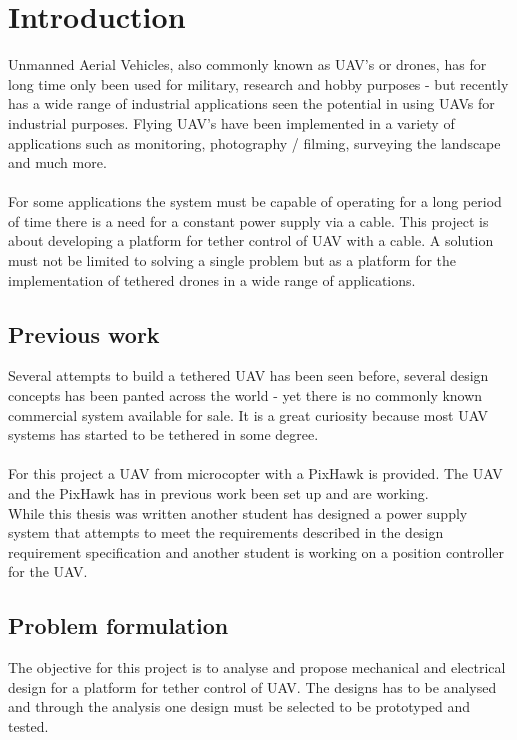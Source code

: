 \chapter{Introduction}

Unmanned Aerial Vehicles, also commonly known as UAV's or drones, has for long time only been used for military, research and hobby purposes - but recently has a wide range of industrial applications seen the potential in using UAVs for industrial purposes.
Flying UAV's have been implemented in a variety of applications such as monitoring, photography / filming, surveying the landscape and much more.\\
\\
For some applications the system must be capable of operating for a long period of time there is a need for a constant power supply via a cable. This project is about developing a platform for tether control of UAV with a cable.
A solution must not be limited to solving a single problem but as a platform for the implementation of tethered drones in a wide range of applications.


\section{Previous work}
Several attempts to build a tethered UAV has been seen before, several design concepts has been panted across the world - yet there is no commonly known commercial system available for sale. It is a great curiosity because most UAV systems has started to be tethered in some degree.\\
\\
For this project a UAV from microcopter with a PixHawk is provided. The UAV and the PixHawk has in previous work been set up and are working.\\
\noindent
While this thesis was written another student has designed a power supply system that attempts to meet the requirements described in the design requirement specification and another student is working on a position controller for the UAV.\\
 


\section{Problem formulation} 

The objective for this project is to analyse and propose mechanical and electrical design for a platform for tether control of UAV. The designs has to be analysed and through the analysis one design must be selected to be prototyped and tested.

